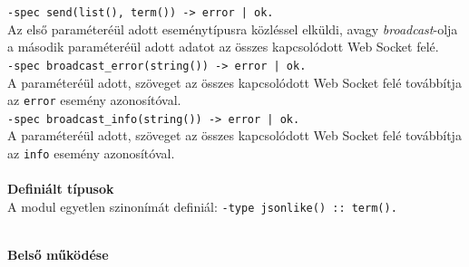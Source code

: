 \noindent \lstinline{-spec send(list(), term()) -> error | ok.}\\
\noindent Az első paraméteréül adott eseménytípusra közléssel elküldi, avagy \textit{broadcast}-olja a második paraméteréül adott adatot az összes kapcsolódott Web Socket felé.\\

\noindent \lstinline{-spec broadcast_error(string()) -> error | ok.}\\
\noindent A paraméteréül adott, szöveget az összes kapcsolódott Web Socket felé továbbítja az \lstinline{error} esemény azonosítóval.\\

\noindent \lstinline{-spec broadcast_info(string()) -> error | ok.}\\
\noindent A paraméteréül adott, szöveget az összes kapcsolódott Web Socket felé továbbítja az \lstinline{info} esemény azonosítóval.\\

\\
\vspace{14pt}
\noindent \textbf{Definiált típusok}
\\
\noindent A modul egyetlen szinonímát definiál:
\noindent \lstinline{-type jsonlike() :: term().}


\\
\vspace{14pt}
\noindent \textbf{Belső működése}
\\


